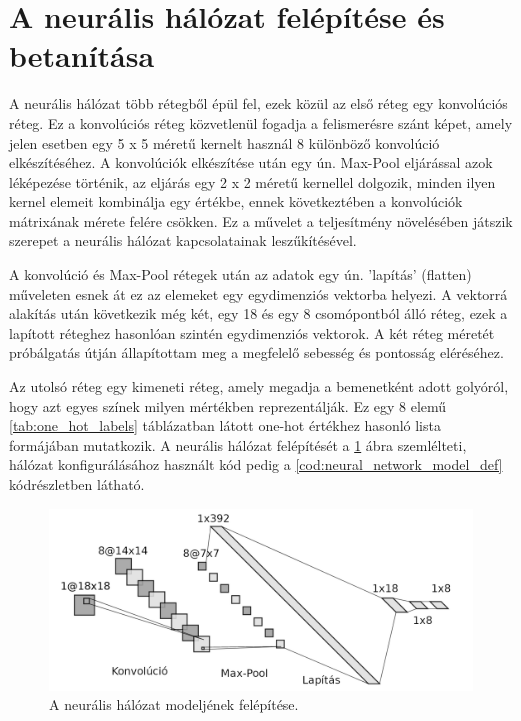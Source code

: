 \section{A neurális hálózat felépítése és betanítása}
A neurális hálózat több rétegből épül fel, ezek közül az első réteg egy konvolúciós réteg. Ez a konvolúciós réteg közvetlenül fogadja a felismerésre szánt képet, amely jelen esetben egy 5 x 5 méretű kernelt használ 8 különböző konvolúció elkészítéséhez. A konvolúciók elkészítése után egy ún. Max-Pool eljárással azok léképezése történik, az eljárás egy 2 x 2 méretű kernellel dolgozik, minden ilyen kernel elemeit kombinálja egy értékbe, ennek következtében a konvolúciók mátrixának mérete felére csökken. Ez a művelet a teljesítmény növelésében játszik szerepet a neurális hálózat kapcsolatainak leszűkítésével.
\par A konvolúció és Max-Pool rétegek után az adatok egy ún. 'lapítás' (flatten) műveleten esnek át ez az elemeket egy egydimenziós vektorba helyezi. A vektorrá alakítás után következik még két, egy 18 és egy 8 csomópontból álló réteg, ezek a lapított réteghez hasonlóan szintén egydimenziós vektorok. A két réteg méretét próbálgatás útján állapítottam meg a megfelelő sebesség és pontosság eléréséhez.
\par Az utolsó réteg egy kimeneti réteg, amely megadja a bemenetként adott golyóról, hogy azt egyes színek milyen mértékben reprezentálják. Ez egy 8 elemű \ref{tab:one_hot_labels} táblázatban látott one-hot értékhez hasonló lista formájában mutatkozik. A neurális hálózat felépítését a \ref{fig:neural_network_model} ábra szemlélteti, hálózat konfigurálásához használt kód pedig a \ref{cod:neural_network_model_def} kódrészletben látható.

\begin{figure}[!ht]
    \centering
    \includegraphics[width=140mm, keepaspectratio]{figures/neural_network_model.png}
    \caption{A neurális hálózat modeljének felépítése.\cite{alexlenail}}
    \label{fig:neural_network_model}
\end{figure}

